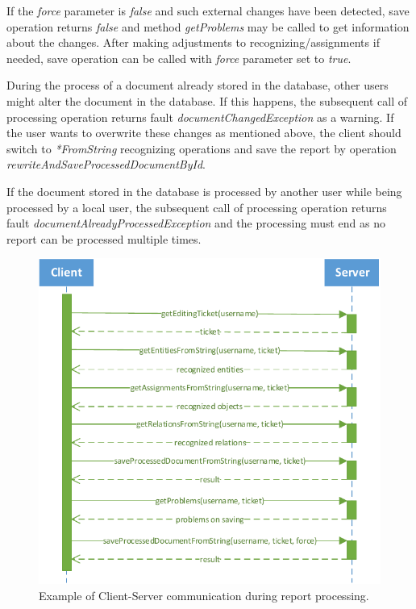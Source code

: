 If the \emph{force} parameter is \emph{false} and such external changes have
been detected, save operation returns \emph{false} and method \emph{getProblems} may be
called to get information about the changes. After making adjustments to
recognizing/assignments if needed, save operation can be called with
\emph{force} parameter set to \emph{true}.

During the process of a document already stored in the database, other users
might alter the document in the database. If this happens, the subsequent call of processing
operation returns fault \emph{documentChangedException} as a warning. If the
user wants to overwrite these changes as mentioned above, the client should
switch to \emph{*FromString} recognizing operations and save the report by
operation \emph{rewriteAndSaveProcessedDocumentById}.

If the document stored in the database is processed by another user while
being processed by a local user, the subsequent call of processing operation
returns fault \emph{documentAlreadyProcessedException} and the processing must
end as no report can be processed multiple times.

\begin{figure}[!htb]
        \centering
        \includegraphics{Images/ClientServerCommunication}
        \caption{Example of Client-Server communication during report processing.}
        \label{fig:ClientServerCommunication}
\end{figure}
